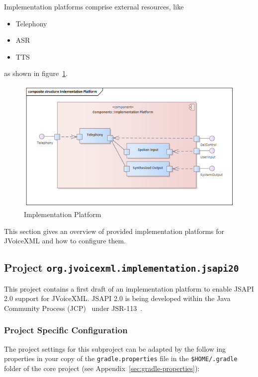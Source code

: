 \documentclass[11pt,a4paper]{article}
\begin{document}
Implementation platforms comprise external resources, like
\begin{itemize}
  \item Telephony
  \item ASR
  \item TTS
\end{itemize}
as shown in figure~\ref{fig:implementation-platform}.
\begin{figure}
\includegraphics[width=\linewidth]{implementation-platform.png}
\caption{Implementation Platform}
\label{fig:implementation-platform}
\end{figure}

This section gives an overview of provided implementation platforms for JVoiceXML
and how to configure them.

\subsection{Project \texttt{org.jvoicexml.implementation.jsapi20}}
\label{sec:implementation-jsapi20}

This project contains a first draft of an implementation platform to enable
JSAPI 2.0 support for JVoiceXML. JSAPI 2.0 is being developed within the Java 
Community Process (JCP)~\cite{jcp} under JSR-113~\cite{jcp:jsr113}.

\subsubsection{Project Specific Configuration}

The project settings for this subproject can be adapted by the follow   ing 
properties in your copy of the \texttt{gradle.properties} file in the
\texttt{\${HOME}/.gradle} folder of the core project (see 
Appendix~\ref{sec:gradle-properties}):
\end{document}
